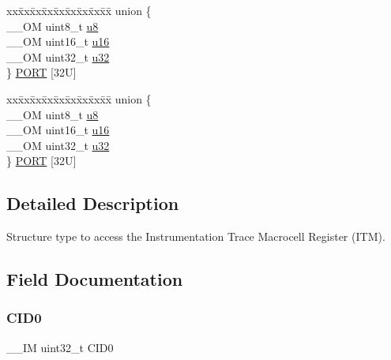 \begin{DoxyCompactItemize}
\begin{tabbing}
\end{tabbing}\item 
\begin{tabbing}
xx\=xx\=xx\=xx\=xx\=xx\=xx\=xx\=xx\=\kill
union \{\\
\>\_\_OM uint8\_t \hyperlink{struct_i_t_m___type_a4c0550e859d614c607bd4b575f05425c}{u8}\\
\>\_\_OM uint16\_t \hyperlink{struct_i_t_m___type_ae93660eefe2482a8564fae9a1ca39739}{u16}\\
\>\_\_OM uint32\_t \hyperlink{struct_i_t_m___type_ae89dd50f788f12863c681fba1a5b60d1}{u32}\\
\} \hyperlink{struct_i_t_m___type_a1e83289e7a6de858bcdc3e124b457732}{PORT} \mbox{[}32U\mbox{]}\\

\end{tabbing}\item 
\begin{tabbing}
xx\=xx\=xx\=xx\=xx\=xx\=xx\=xx\=xx\=\kill
union \{\\
\>\_\_OM uint8\_t \hyperlink{struct_i_t_m___type_a4c0550e859d614c607bd4b575f05425c}{u8}\\
\>\_\_OM uint16\_t \hyperlink{struct_i_t_m___type_ae93660eefe2482a8564fae9a1ca39739}{u16}\\
\>\_\_OM uint32\_t \hyperlink{struct_i_t_m___type_ae89dd50f788f12863c681fba1a5b60d1}{u32}\\
\} \hyperlink{struct_i_t_m___type_a99bba7451f79c00e8684aa0986b74901}{PORT} \mbox{[}32U\mbox{]}\\

\end{tabbing}\end{DoxyCompactItemize}


\subsection{Detailed Description}
Structure type to access the Instrumentation Trace Macrocell Register (I\+TM). 

\subsection{Field Documentation}
\mbox{\label{struct_i_t_m___type_a26bbad5d9e0f1d302611d52373aef839}} 
\subsubsection{\texorpdfstring{C\+I\+D0}{CID0}}
{\footnotesize\ttfamily \+\_\+\+\_\+\+IM uint32\+\_\+t C\+I\+D0}

